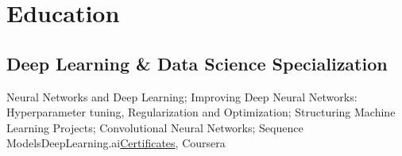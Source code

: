 \documentclass[10pt,a4paper,sans]{moderncv}
\begin{document}


\vspace{-20pt}
\section{Education}    

\subsection{Deep Learning \& Data Science Specialization}


{Neural Networks and Deep Learning; Improving Deep Neural Networks: Hyperparameter tuning, Regularization and Optimization; Structuring Machine Learning Projects;
Convolutional Neural Networks; Sequence Models}{DeepLearning.ai}{\href{https://www.coursera.org/account/accomplishments/specialization/5VGBE56Q62GE}{Certificates}, Coursera}{}
\end{document}
